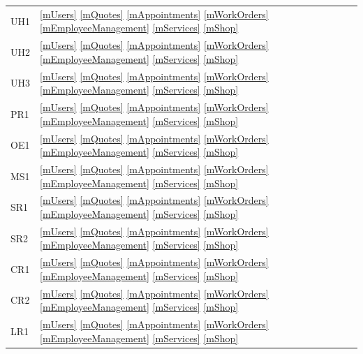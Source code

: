 \documentclass[12pt, titlepage]{article}
\begin{document}
\begin{longtable}{p{} p{}}
	UH1                   & \ref{mUsers} \ref{mQuotes} \ref{mAppointments} \ref{mWorkOrders} \ref{mEmployeeManagement} \ref{mServices} \ref{mShop} \\
	UH2                   & \ref{mUsers} \ref{mQuotes} \ref{mAppointments} \ref{mWorkOrders} \ref{mEmployeeManagement} \ref{mServices} \ref{mShop} \\
	UH3                   & \ref{mUsers} \ref{mQuotes} \ref{mAppointments} \ref{mWorkOrders} \ref{mEmployeeManagement} \ref{mServices} \ref{mShop} \\
	PR1                   & \ref{mUsers} \ref{mQuotes} \ref{mAppointments} \ref{mWorkOrders} \ref{mEmployeeManagement} \ref{mServices} \ref{mShop} \\
	OE1                   & \ref{mUsers} \ref{mQuotes} \ref{mAppointments} \ref{mWorkOrders} \ref{mEmployeeManagement} \ref{mServices} \ref{mShop} \\
	MS1                   & \ref{mUsers} \ref{mQuotes} \ref{mAppointments} \ref{mWorkOrders} \ref{mEmployeeManagement} \ref{mServices} \ref{mShop} \\
	SR1                   & \ref{mUsers} \ref{mQuotes} \ref{mAppointments} \ref{mWorkOrders} \ref{mEmployeeManagement} \ref{mServices} \ref{mShop} \\
	SR2                   & \ref{mUsers} \ref{mQuotes} \ref{mAppointments} \ref{mWorkOrders} \ref{mEmployeeManagement} \ref{mServices} \ref{mShop} \\
	CR1                   & \ref{mUsers} \ref{mQuotes} \ref{mAppointments} \ref{mWorkOrders} \ref{mEmployeeManagement} \ref{mServices} \ref{mShop} \\
	CR2                   & \ref{mUsers} \ref{mQuotes} \ref{mAppointments} \ref{mWorkOrders} \ref{mEmployeeManagement} \ref{mServices} \ref{mShop} \\
	LR1                   & \ref{mUsers} \ref{mQuotes} \ref{mAppointments} \ref{mWorkOrders} \ref{mEmployeeManagement} \ref{mServices} \ref{mShop} \\
	\bottomrule
\end{longtable}
\end{document}
